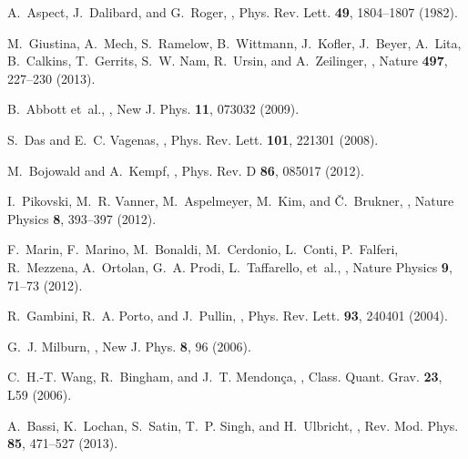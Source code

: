 \documentclass[11pt]{article}
\begin{document}
\begin{thebibliography}{100}
A.~Aspect, J.~Dalibard, and G.~Roger,
,
\newblock Phys. Rev. Lett. {\bf 49}, 1804--1807 (1982).

M.~Giustina, A.~Mech, S.~Ramelow, B.~Wittmann, J.~Kofler, J.~Beyer, A.~Lita,
  B.~Calkins, T.~Gerrits, S.~W. Nam, R.~Ursin, and A.~Zeilinger,
,
\newblock Nature {\bf 497}, 227--230 (2013).

B.~Abbott et~al.,
,
\newblock New J. Phys. {\bf 11}, 073032 (2009).

S.~Das and E.~C. Vagenas,
,
\newblock Phys. Rev. Lett. {\bf 101}, 221301 (2008).

M.~Bojowald and A.~Kempf,
,
\newblock Phys. Rev. D {\bf 86}, 085017 (2012).

I.~Pikovski, M.~R. Vanner, M.~Aspelmeyer, M.~Kim, and {\v{C}}.~Brukner,
,
\newblock Nature Physics {\bf 8}, 393--397 (2012).

F.~Marin, F.~Marino, M.~Bonaldi, M.~Cerdonio, L.~Conti, P.~Falferi, R.~Mezzena,
  A.~Ortolan, G.~A. Prodi, L.~Taffarello, et~al.,
,
\newblock Nature Physics {\bf 9}, 71--73 (2012).

R.~Gambini, R.~A. Porto, and J.~Pullin,
,
\newblock Phys. Rev. Lett. {\bf 93}, 240401 (2004).

G.~J. Milburn,
,
\newblock New J. Phys. {\bf 8}, 96 (2006).

C.~H.-T. Wang, R.~Bingham, and J.~T. Mendonça,
,
\newblock Class. Quant. Grav. {\bf 23}, L59 (2006).

A.~Bassi, K.~Lochan, S.~Satin, T.~P. Singh, and H.~Ulbricht,
,
\newblock Rev. Mod. Phys. {\bf 85}, 471--527 (2013).


\end{thebibliography}
\end{document}
